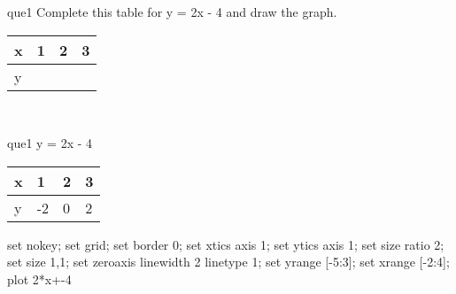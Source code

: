 \documentclass[13.5pt, varwidth=true]{beamer}
\begin{document}
\begin{frame}[shrink=19,fragile]
	\begin{beamercolorbox}[rounded=true, left, shadow=true,wd=14.8cm]{que1}
		 Complete this table for y = 2x - 4 and draw the graph. \\[0.3cm] \renewcommand{\arraystretch}{1.2}\begin{tabular}{|C|C|C|C|} \hline x & 1 & 2 & 3 \\ \hline y & & & \\ \hline \end{tabular}\\[0.3cm]
	\end{beamercolorbox}
\end{frame}
\begin{frame}[shrink=19,fragile]
	\begin{beamercolorbox}[rounded=true, left, shadow=true,wd=14.8cm]{que1}
		y = 2x - 4\renewcommand{\arraystretch}{1.2}\begin{tabular}{|C|C|C|C|} \hline x & 1 & 2 & 3 \\ \hline y & -2 & 0 & 2\\ \hline \end{tabular}\begin{gnuplot}[terminal=pdf] set nokey; set grid; set border 0; set xtics axis 1; set ytics axis 1; set size ratio 2; set size 1,1; set zeroaxis linewidth 2 linetype 1; set yrange [-5:3]; set xrange [-2:4]; plot 2*x+-4 \end{gnuplot}
	\end{beamercolorbox}
\end{frame}
\end{document}
